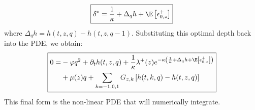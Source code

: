 \documentclass[12pt]{article}
\begin{document}
\begin{equation}\label{eq:depth}
\boxed{\delta^{*} = \dfrac{1}{\kappa} + \Delta_q h + \E \left[ \epsilon^+_{0,z} \right]}
\end{equation}
where $\Delta_q h = h(t,z,q) - h(t,z,q-1)$. Substituting this optimal depth back into the PDE, we obtain: 
\begin{equation}
\boxed{
\begin{split}0 = & - \varphi q^2 + \partial_t h(t,z,q) + \dfrac{1}{\kappa} \lambda^+(z) e^{ -\kappa \left( \frac{1}{\kappa} + \Delta_q h + \E \left[ \epsilon^+_{0,z} \right] \right) } \\
 & + \mu(z) q + \sum_{k=-1,0,1} G_{z,k} \left[ h(t,k,q) - h(t,z,q) \right]
\end{split}
}
\end{equation}
This final form is the non-linear PDE that will numerically integrate. 
\end{document}
